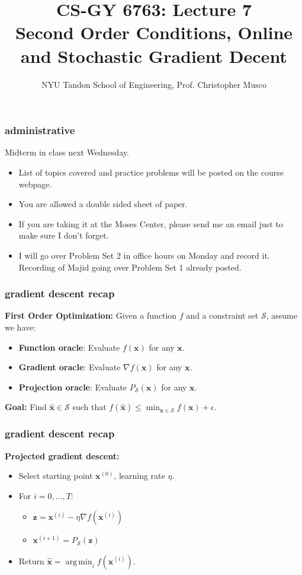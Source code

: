 \documentclass[compress]{beamer}
\title{CS-GY 6763: Lecture 7 \\ Second Order Conditions, Online and Stochastic Gradient Decent}
\author{NYU Tandon School of Engineering, Prof. Christopher Musco}
\date{}
\newcommand{\bv}[1]{\mathbf{#1}}
\DeclareMathOperator*{\argmin}{arg\,min}
\begin{document}
\begin{frame}
	\titlepage 
\end{frame}


\begin{frame}[t]
	\frametitle{administrative}
		Midterm in class next Wednesday. 
		\begin{itemize}
			\item List of topics covered and practice problems will be posted on the course webpage. 
			\item You are allowed a double sided sheet of paper. 
			\item If you are taking it at the Moses Center, please send me an email just to make sure I don't forget.
			\item I will go over Problem Set 2 in office hours on Monday and record it. Recording of Majid going over Problem Set 1 already posted. 
		\end{itemize}
\end{frame}

\begin{frame}[t]
	\frametitle{gradient descent recap}
	\textbf{First Order Optimization:} Given a function $f$ and a constraint set $\mathcal{S}$, assume we have:
	\begin{itemize}
		\item \textbf{Function oracle}: Evaluate $f(\bv{x})$ for any $\bv{x}$. 
		\item \textbf{Gradient oracle}: Evaluate $\nabla f(\bv{x})$ for any $\bv{x}$.
		\item \textbf{{Projection oracle}}: Evaluate $P_{\mathcal{S}}(\bv{x})$ for any $\bv{x}$.
	\end{itemize}
\begin{center}
	\textbf{Goal:} Find $\hat{\bv{x}}\in \mathcal{S}$ such that $f(\hat{\bv{x}}) \leq \min_{\bv{x}\in \mathcal{S}}f(\bv{x})+\epsilon$.
\end{center}
\end{frame}

\begin{frame}[t]
	\frametitle{gradient descent recap}
	\textbf{Projected gradient descent:}
	\begin{itemize}
		\item Select starting point $\bv{x}^{(0)}$, learning rate $\eta$. 
		\item For $i = 0,\ldots, T$:
		\begin{itemize}
			\item $\bv{z} = \bv{x}^{(i)} - \eta \nabla f(\bv{x}^{(i)})$
			\item $\bv{x}^{(i+1)} = P_\mathcal{S}(\bv{z})$
		\end{itemize}
		\item Return $\hat{\bv{x}} = \argmin_{i} f(\bv{x}^{(i)})$.
	\end{itemize}
\end{frame}
\end{document}
